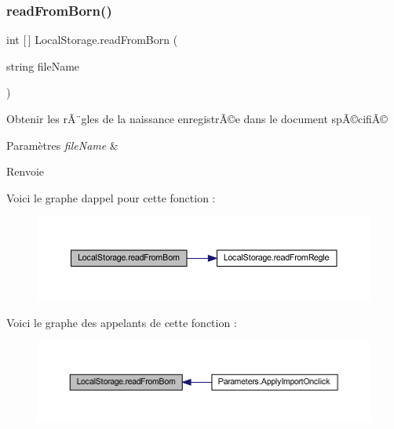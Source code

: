 \subsubsection{\texorpdfstring{read\+From\+Born()}{readFromBorn()}}
{\footnotesize\ttfamily int \mbox{[}$\,$\mbox{]} Local\+Storage.\+read\+From\+Born (\begin{DoxyParamCaption}\item[{string}]{file\+Name }\end{DoxyParamCaption})\hspace{0.3cm}{\ttfamily [inline]}}



Obtenir les rÃ¨gles de la naissance enregistrÃ©e dans le document spÃ©cifiÃ© 


\begin{DoxyParams}{Paramètres}
{\em file\+Name} & \\
\hline
\end{DoxyParams}
\begin{DoxyReturn}{Renvoie}

\end{DoxyReturn}
Voici le graphe d\textquotesingle{}appel pour cette fonction \+:\nopagebreak
\begin{figure}[H]
\begin{center}
\leavevmode
\includegraphics[width=350pt]{class_local_storage_aa66a98dccf6cb550c5a38c25b9712898_cgraph}
\end{center}
\end{figure}
Voici le graphe des appelants de cette fonction \+:\nopagebreak
\begin{figure}[H]
\begin{center}
\leavevmode
\includegraphics[width=350pt]{class_local_storage_aa66a98dccf6cb550c5a38c25b9712898_icgraph}
\end{center}
\end{figure}
\mbox{\label{class_local_storage_a200c8f22ceed88238703411e2c0f1e05}} 
